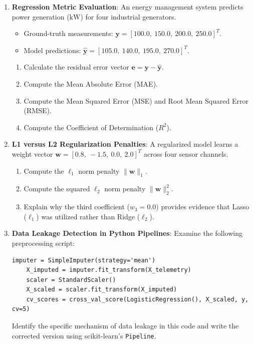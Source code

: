 \begin{checkyourself}
\begin{enumerate}
    \item \textbf{Regression Metric Evaluation}:
    An energy management system predicts power generation ($\text{kW}$) for four industrial generators.
    \begin{itemize}
        \item Ground-truth measurements: $\mathbf{y} = [100.0, \ 150.0, \ 200.0, \ 250.0]^T$.
        \item Model predictions: $\hat{\mathbf{y}} = [105.0, \ 140.0, \ 195.0, \ 270.0]^T$.
    \end{itemize}
    \begin{enumerate}[label=(\alph*)]
        \item Calculate the residual error vector $\mathbf{e} = \mathbf{y} - \hat{\mathbf{y}}$.
        \item Compute the Mean Absolute Error (MAE).
        \item Compute the Mean Squared Error (MSE) and Root Mean Squared Error (RMSE).
        \item Compute the Coefficient of Determination ($R^2$).
    \end{enumerate}

    \item \textbf{L1 versus L2 Regularization Penalties}:
    A regularized model learns a weight vector $\mathbf{w} = [0.8, \ -1.5, \ 0.0, \ 2.0]^T$ across four sensor channels.
    \begin{enumerate}[label=(\alph*)]
        \item Compute the $\ell_1$ norm penalty $\|\mathbf{w}\|_1$.
        \item Compute the squared $\ell_2$ norm penalty $\|\mathbf{w}\|_2^2$.
        \item Explain why the third coefficient ($w_3 = 0.0$) provides evidence that Lasso ($\ell_1$) was utilized rather than Ridge ($\ell_2$).
    \end{enumerate}

    \item \textbf{Data Leakage Detection in Python Pipelines}:
    Examine the following preprocessing script:
    \begin{lstlisting}[style=pythonstyle]
    imputer = SimpleImputer(strategy='mean')
    X_imputed = imputer.fit_transform(X_telemetry)
    scaler = StandardScaler()
    X_scaled = scaler.fit_transform(X_imputed)
    cv_scores = cross_val_score(LogisticRegression(), X_scaled, y, cv=5)
    \end{lstlisting}
    Identify the specific mechanism of data leakage in this code and write the corrected version using scikit-learn's \texttt{Pipeline}.
\end{enumerate}
\end{checkyourself}


